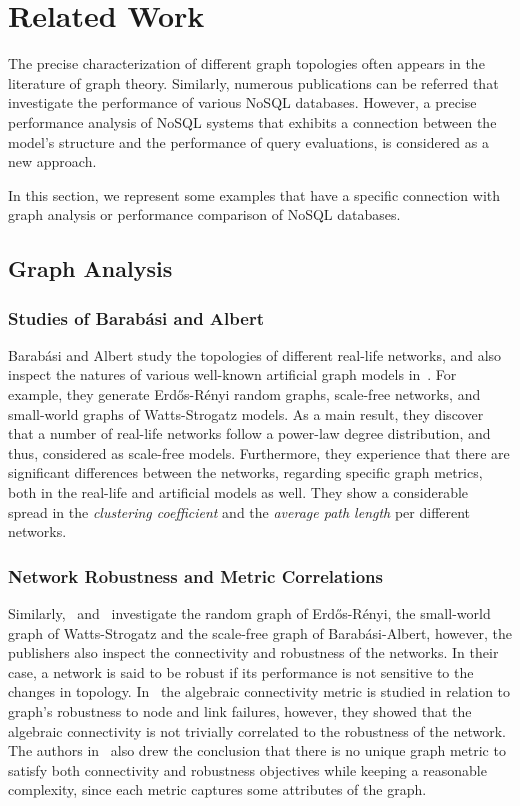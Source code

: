 \chapter{Related Work}

The precise characterization of different graph topologies often appears in the literature of graph theory. Similarly, numerous publications can be referred that investigate the performance of various NoSQL databases. However, a precise performance analysis of NoSQL systems that exhibits a connection between the model's structure and the performance of query evaluations, is considered as a new approach.

In this section, we represent some examples that have a specific connection with graph analysis or performance comparison of NoSQL databases.

\section{Graph Analysis}
\subsection{Studies of Barabási and Albert}

Barabási and Albert study the topologies of different real-life networks, and also inspect the natures of various well-known artificial graph models in~\cite{statistical_mechanics}. For example, they generate Erdős-Rényi random graphs, scale-free networks, and small-world graphs of Watts-Strogatz models. As a main result, they discover that a number of real-life networks follow a power-law degree distribution, and thus, considered as scale-free models. Furthermore, they experience that there are significant differences between the networks, regarding specific graph metrics, both in the real-life and artificial models as well. They show a considerable spread in the \textit{clustering coefficient} and the \textit{average path length} per different networks.

\subsection{Network Robustness and Metric Correlations}\label{sec:algebraic_connectivity}

Similarly,~\cite{algebraic1} and~\cite{algebraic2} investigate the random graph of Erdős-Rényi, the small-world graph of Watts-Strogatz and the scale-free graph of Barabási-Albert, however, the publishers also inspect the connectivity and robustness of the networks. In their case, a network is said to be robust if its performance is not sensitive to the changes in topology. In~\cite{algebraic1} the algebraic connectivity metric is studied in relation to graph’s robustness to node and link failures, however, they showed that the algebraic connectivity is not trivially correlated to the robustness of the network. The authors in~\cite{algebraic2} also drew the conclusion that there is no unique graph metric to satisfy both connectivity and robustness objectives while keeping a reasonable complexity, since each metric captures some attributes of the graph.

